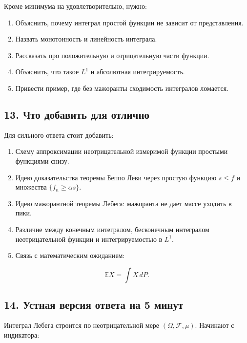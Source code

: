 \documentclass[
  11pt,
  a4paper,
]{article}
\providecommand{\tightlist}{%
  \setlength{\itemsep}{0pt}\setlength{\parskip}{0pt}}
\begin{document}
Кроме минимума на удовлетворительно, нужно:

\begin{enumerate}
\def\labelenumi{\arabic{enumi}.}
\tightlist
\item
  Объяснить, почему интеграл простой функции не зависит от
  представления.
\item
  Назвать монотонность и линейность интеграла.
\item
  Рассказать про положительную и отрицательную части функции.
\item
  Объяснить, что такое \(L^1\) и абсолютная интегрируемость.
\item
  Привести пример, где без мажоранты сходимость интегралов ломается.
\end{enumerate}

\subsection{13. Что добавить для
отлично}\label{ux447ux442ux43e-ux434ux43eux431ux430ux432ux438ux442ux44c-ux434ux43bux44f-ux43eux442ux43bux438ux447ux43dux43e}

Для сильного ответа стоит добавить:

\begin{enumerate}
\def\labelenumi{\arabic{enumi}.}
\tightlist
\item
  Схему аппроксимации неотрицательной измеримой функции простыми
  функциями снизу.
\item
  Идею доказательства теоремы Беппо Леви через простую функцию
  \(s\le f\) и множества \(\{f_n\ge\alpha s\}\).
\item
  Идею мажорантной теоремы Лебега: мажоранта не дает массе уходить в
  пики.
\item
  Различие между конечным интегралом, бесконечным интегралом
  неотрицательной функции и интегрируемостью в \(L^1\).
\item
  Связь с математическим ожиданием:
\end{enumerate}

\[
\mathbb E X=\int X\,dP.
\]

\subsection{14. Устная версия ответа на 5
минут}\label{ux443ux441ux442ux43dux430ux44f-ux432ux435ux440ux441ux438ux44f-ux43eux442ux432ux435ux442ux430-ux43dux430-5-ux43cux438ux43dux443ux442}

Интеграл Лебега строится по неотрицательной мере
\((\Omega,\mathcal F,\mu)\). Начинают с индикатора:
\end{document}
